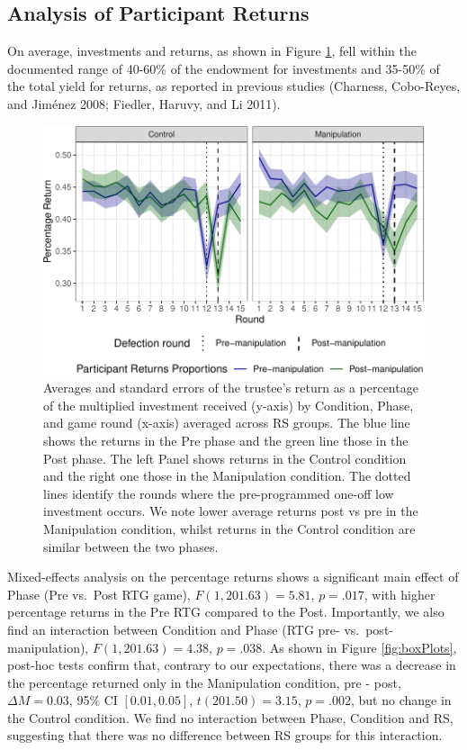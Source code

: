 \documentclass[
]{article}
\begin{document}
\subsection{Analysis of Participant Returns}\label{analysis-of-participant-returns}

On average, investments and returns, as shown in Figure \ref{fig:gamesPlot}, fell within the documented range of 40-60\% of the endowment for investments and 35-50\% of the total yield for returns, as reported in previous studies (Charness, Cobo-Reyes, and Jiménez 2008; Fiedler, Haruvy, and Li 2011).

\begin{figure}

{\centering \includegraphics[width=\textwidth]{article_files/figure-latex/gamesPlot-1} 

}

\caption{Averages and standard errors of the trustee's return as a percentage of the multiplied investment received (y-axis) by Condition, Phase, and game round (x-axis) averaged across RS groups. The blue line shows the returns in the Pre phase and the green line those in the Post phase. The left Panel shows returns in the Control condition and the right one those in the Manipulation condition. The dotted lines identify the rounds where the pre-programmed one-off low investment occurs. We note lower average returns post vs pre in the Manipulation condition, whilst returns in the Control condition are similar between the two phases.}\label{fig:gamesPlot}
\end{figure}

Mixed-effects analysis on the percentage returns shows a significant main effect of Phase (Pre vs.~Post RTG game), \(F(1, 201.63) = 5.81\), \(p = .017\), with higher percentage returns in the Pre RTG compared to the Post. Importantly, we also find an interaction between Condition and Phase (RTG pre- vs.~post-manipulation), \(F(1, 201.63) = 4.38\), \(p = .038\). As shown in Figure \ref{fig:boxPlots}, post-hoc tests confirm that, contrary to our expectations, there was a decrease in the percentage returned only in the Manipulation condition, pre - post,
\(\Delta M = 0.03\), 95\% CI \([0.01, 0.05]\), \(t(201.50) = 3.15\), \(p = .002\), but no change in the Control condition. We find no interaction between Phase, Condition and RS, suggesting that there was no difference between RS groups for this interaction.
\end{document}
